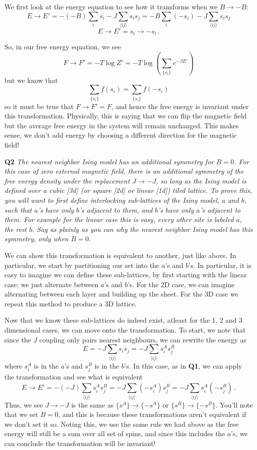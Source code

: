 \documentclass[10pt]{article}
\begin{document}
We first look at the energy equation to see how it transforms when we $B \to -B$:
\[
E \to E' = -(-B)\sum_{i}s_{i} - J\sum_{\langle ij\rangle}s_{i}s_{j} = -B\sum_{i}(-s_{i}) - J\sum_{\langle ij\rangle}s_{i}s_{j} 
\]
\[
E\to E' = s_{i} \to -s_{i} \, .
\]

So, in our free energy equation, we see
\[
F \to F' = -T\log Z' = -T\log\left(\sum_{\{s_{i}\}}e^{-\beta E'}\right)
\]
but we know that
\[
\sum_{\{s_{i}\}}f(s_{i}) = \sum_{\{s_{i}\}}f(-s_{i})
\]
so it must be true that $F \to F' = F$, and hence the free energy is invariant under this transformation. Physically, this is saying that we can flip the magnetic field but the average free energy in the system will remain unchanged. This makes sense, we don't add energy by choosing a different direction for the magnetic field!

\textbf{Q2} \textit{The nearest neighbor Ising model has an additional symmetry for $B = 0$. For this case of zero external magnetic field, there is an additional symmetry of the free energy density under the replacement $J \to -J$, so long as the Ising model is defined over a cubic [3d] (or square [2d] or linear [1d]) tiled lattice. To prove this, you will want to first define interlocking sub-lattices of the Ising model, $a$ and $b$, such that $a$'s have only $b$'s adjacent to them, and $b$'s have only $a$'s adjacent to them. For example for the linear case this is easy, every other site is labeled $a$, the rest $b$. Say as plainly as you can why the nearest neighbor Ising model has this symmetry, only when $B = 0$.}

We can show this transformation is equivalent to another, just like above. In particular, we start by partitioning our set into the $a$'s and $b$'s. In particular, it is easy to imagine we can define these sub-lattices, by first starting with the linear case; we just alternate between $a$'s and $b$'s. For the 2D case, we can imagine alternating between each layer and building up the sheet. For the 3D case we repeat this method to produce a 3D lattice.

Now that we know these sub-lattices do indeed exist, atleast for the 1, 2 and 3 dimensional cases, we can move onto the transformation. To start, we note that since the $J$ coupling only pairs nearest neighbours, we can rewrite the energy as
\[
E = -J\sum_{\langle ij\rangle}s_{i}s_{j} = -J\sum_{\langle ij\rangle}s^{A}_{i}s^{B}_{j}
\]
where $s^{A}_{i}$ is in the $a$'s and $s^{B}_{j}$ is in the $b$'s. In this case, as in \textbf{Q1}, we can apply the transformation and see what is equivalent
\[
E \to E' = -(-J)\sum_{\langle ij\rangle}s^{A}_{i}s^{B}_{j} = -J\sum_{\langle ij\rangle}(-s^{A}_{i})s^{B}_{j} = -J\sum_{\langle ij\rangle}s^{A}_{i}(-s^{B}_{j}) \,.
\]
Thus, we see $J \to -J$ is the same as $\{s^{A}\} \to \{-s^{A}\}$ or $\{s^{B}\} \to \{-s^{B}\}$. You'll note that we set $B = 0$, and this is because these transformations aren't equivalent if we don't set it so. Noting this, we use the same rule we had above as the free energy will still be a sum over all set of spins, and since this includes the $a$'s, we can conclude the transformation will be invariant!
\end{document}
